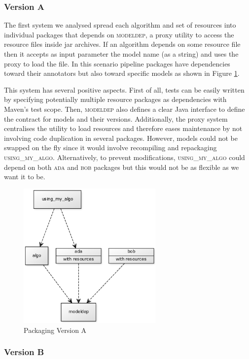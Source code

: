 \documentclass{article}
\newcommand{\ID}[1]{{\textsc{#1}}}
\begin{document}
\subsubsection{Version A}

The first system we analysed spread each algorithm and set of resources into individual packages that depends on \ID{modeldep}, a proxy utility to access the resource files inside jar archives. If an algorithm depends on some resource file then it accepts as input parameter the model name (as a string) and uses the proxy to load the file. In this scenario pipeline packages have dependencies toward their annotators but also toward specific models as shown in Figure \ref{fig:pkgsysA}.

This system has several positive aspects. First of all, tests can be easily written by specifying potentially multiple resource packages as dependencies with Maven's test scope. Then, \ID{modeldep} also defines a clear Java interface to define the contract for models and their versions. Additionally, the proxy system centralises the utility to load resources and therefore eases maintenance by not involving code duplication in several packages. However, models could not be swapped on the fly since it would involve recompiling and repackaging \ID{using\_my\_algo}.  Alternatively, to prevent modifications, \ID{using\_my\_algo} could depend on both \ID{ada} and \ID{bob} packages but this would not be as flexible as we want it to be.

\begin{figure}
\centering
\includegraphics[width=200pt]{res/packaging_version_A.png}
\caption{Packaging Version A}
\label{fig:pkgsysA}
\end{figure}


\subsubsection{Version B}
\end{document}
